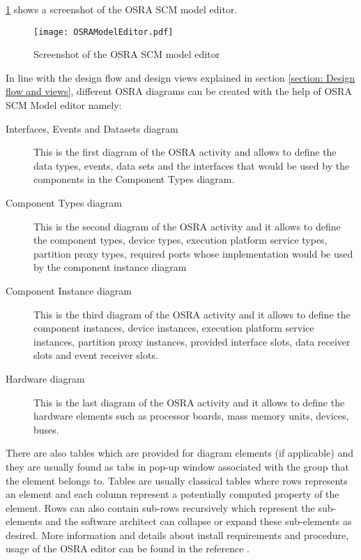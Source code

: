\cref{fig: OSRA model editor} shows a screenshot of the OSRA SCM model editor.

\begin{figure}[h]
	\centering
	\texttt{[image: OSRAModelEditor.pdf]}
	\caption{Screenshot of the OSRA SCM model editor}
	\label{fig: OSRA model editor}
\end{figure}

In line with the design flow and design views explained in section \cref{section: Design flow and views}, different OSRA diagrams can be created with the help of OSRA SCM Model editor namely:
\begin{description}
\item [Interfaces, Events and Datasets diagram] This is the first diagram of the OSRA activity and allows to define the data types, events, data sets and the interfaces that would be used by the components in the Component Types diagram.
\item [Component Types diagram] This is the second diagram of the OSRA activity and it allows to define the component types, device types, execution platform service types, partition proxy types, required ports whose implementation would be used by the component instance diagram
\item [Component Instance diagram] This is the third diagram of the OSRA activity and it allows to define the component instances, device instances, execution platform service instances, partition proxy instances, provided interface slots, data receiver slots and event receiver slots.
\item [Hardware diagram] This is the last diagram of the OSRA activity and it allows to define the hardware elements such as processor boards, mass memory units, devices, buses.
\end{description}

There are also tables which are provided for diagram elements (if applicable) and they are usually found as tabs in pop-up window associated with the group that the element belongs to. Tables are usually classical tables where rows represents an element and each column represent a potentially computed property of the element. Rows can also contain sub-rows recursively which represent the sub-elements and the software architect can collapse or expand these sub-elements as desired. More information and details about install requirements and procedure, usage of the OSRA editor can be found in the reference \cite{OSRAEditor}.    
    

  